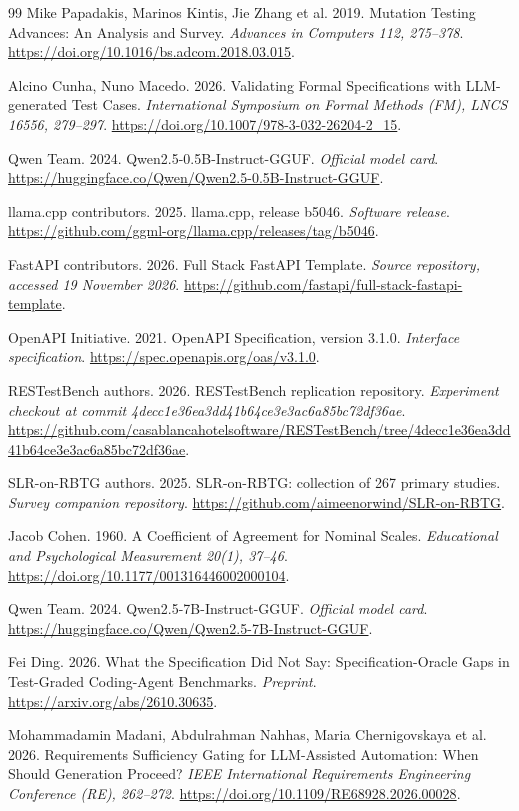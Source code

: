 \documentclass[sigconf,nonacm]{acmart}
\begin{document}
\begin{thebibliography}{99}
 Mike Papadakis, Marinos Kintis, Jie Zhang et al. 2019. Mutation Testing Advances: An Analysis and Survey. \emph{Advances in Computers 112, 275--378}. \url{https://doi.org/10.1016/bs.adcom.2018.03.015}.

 Alcino Cunha, Nuno Macedo. 2026. Validating Formal Specifications with LLM-generated Test Cases. \emph{International Symposium on Formal Methods (FM), LNCS 16556, 279--297}. \url{https://doi.org/10.1007/978-3-032-26204-2_15}.

 Qwen Team. 2024. Qwen2.5-0.5B-Instruct-GGUF. \emph{Official model card}. \url{https://huggingface.co/Qwen/Qwen2.5-0.5B-Instruct-GGUF}.

 llama.cpp contributors. 2025. llama.cpp, release b5046. \emph{Software release}. \url{https://github.com/ggml-org/llama.cpp/releases/tag/b5046}.

 FastAPI contributors. 2026. Full Stack FastAPI Template. \emph{Source repository, accessed 19 November 2026}. \url{https://github.com/fastapi/full-stack-fastapi-template}.

 OpenAPI Initiative. 2021. OpenAPI Specification, version 3.1.0. \emph{Interface specification}. \url{https://spec.openapis.org/oas/v3.1.0}.

 RESTestBench authors. 2026. RESTestBench replication repository. \emph{Experiment checkout at commit 4decc1e36ea3dd41b64ce3e3ac6a85bc72df36ae}. \url{https://github.com/casablancahotelsoftware/RESTestBench/tree/4decc1e36ea3dd41b64ce3e3ac6a85bc72df36ae}.

 SLR-on-RBTG authors. 2025. SLR-on-RBTG: collection of 267 primary studies. \emph{Survey companion repository}. \url{https://github.com/aimeenorwind/SLR-on-RBTG}.

 Jacob Cohen. 1960. A Coefficient of Agreement for Nominal Scales. \emph{Educational and Psychological Measurement 20(1), 37--46}. \url{https://doi.org/10.1177/001316446002000104}.

 Qwen Team. 2024. Qwen2.5-7B-Instruct-GGUF. \emph{Official model card}. \url{https://huggingface.co/Qwen/Qwen2.5-7B-Instruct-GGUF}.

 Fei Ding. 2026. What the Specification Did Not Say: Specification-Oracle Gaps in Test-Graded Coding-Agent Benchmarks. \emph{Preprint}. \url{https://arxiv.org/abs/2610.30635}.

 Mohammadamin Madani, Abdulrahman Nahhas, Maria Chernigovskaya et al. 2026. Requirements Sufficiency Gating for LLM-Assisted Automation: When Should Generation Proceed? \emph{IEEE International Requirements Engineering Conference (RE), 262--272}. \url{https://doi.org/10.1109/RE68928.2026.00028}.


\end{thebibliography}
\end{document}
